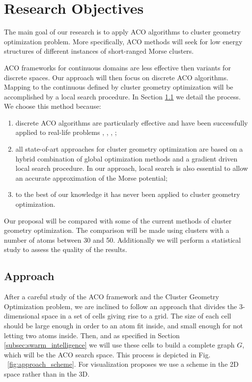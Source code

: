 \chapter{Research Objectives}
\label{chap:research_obj}


The main goal of our research is to apply ACO algorithms to cluster geometry optimization problem. More specifically, ACO methods will seek for low energy structures of different instances of short-ranged Morse clusters. 

ACO frameworks for continuous domains are less effective then variants for discrete spaces. Our approach will then focus on discrete ACO algorithms. Mapping to the continuous defined by cluster geometry optimization will be accomplished by a local search procedure. In Section \ref{sec:approch_method} we detail the process. We choose this method because:
		\begin{enumerate}
			\item discrete ACO algorithms are particularly effective and have been successfully applied to real-life problems \cite{acobook}, \cite{Loiola2007657}, \cite{ hoos03}, \cite{StutzleTSP99};
			\item all state-of-art approaches for cluster geometry optimization are based on a hybrid combination of global optimization methods and a gradient driven local search procedure. In our approach, local search is also essential to allow an accurate approximation of the Morse potential;
			\item to the best of our knowledge it has never been applied to cluster geometry optimization.
		\end{enumerate}

	Our proposal will be compared with some of the current methods of cluster geometry optimization. The comparison will be made using clusters with a number of atoms between 30 and 50. Additionally we will perform a statistical study to assess the quality of the results.
	\pagebreak
\section{Approach}
	\label{sec:approch_method}
	After a careful study of the ACO framework and the Cluster Geometry Optimization problem, we are inclined to follow an approach that divides the 3-dimensional space in a set of cells giving rise to a grid. The size of each cell should be large enough in order to an atom fit inside, and small enough for not letting two atoms inside. Then, and as specified in Section \ref{subsec:swarm_intelligence} we will use these cells to build a complete graph $G$, which will be the ACO search space. This process is depicted in Fig. ~\ref{fig:approach_scheme}. For visualization proposes we use a scheme in the 2D space rather than in the 3D.
	
